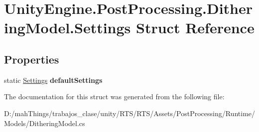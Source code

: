 \hypertarget{struct_unity_engine_1_1_post_processing_1_1_dithering_model_1_1_settings}{}\section{Unity\+Engine.\+Post\+Processing.\+Dithering\+Model.\+Settings Struct Reference}
\label{struct_unity_engine_1_1_post_processing_1_1_dithering_model_1_1_settings}
\subsection*{Properties}
\begin{DoxyCompactItemize}
\item 
\mbox{\label{struct_unity_engine_1_1_post_processing_1_1_dithering_model_1_1_settings_a3eb701066dfc32db93f8aa3bfa540b1a}} 
static \mbox{\hyperlink{struct_unity_engine_1_1_post_processing_1_1_dithering_model_1_1_settings}{Settings}} {\bfseries default\+Settings}
\end{DoxyCompactItemize}


The documentation for this struct was generated from the following file\+:\begin{DoxyCompactItemize}
\item 
D\+:/mah\+Things/trabajos\+\_\+clase/unity/\+R\+T\+S/\+R\+T\+S/\+Assets/\+Post\+Processing/\+Runtime/\+Models/Dithering\+Model.\+cs\end{DoxyCompactItemize}
